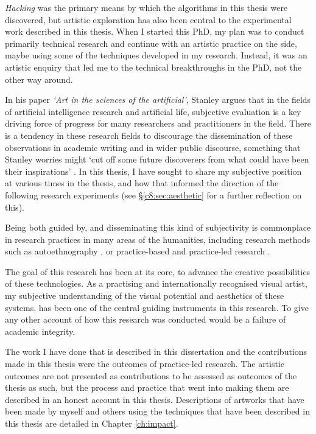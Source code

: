 \textit{Hacking} was the primary means by which the algorithms in this thesis were discovered, but artistic exploration has also been central to the experimental work described in this thesis. 
When I started this PhD, my plan was to conduct primarily technical research and continue with an artistic practice on the side, maybe using some of the techniques developed in my research. 
Instead, it was an artistic enquiry that led me to the technical breakthroughs in the PhD, not the other way around. 

In his paper \textit{`Art in the sciences of the artificial'}, Stanley argues that in the fields of artificial intelligence research and artificial life, subjective evaluation is a key driving force of progress for many researchers and practitioners in the field. 
There is a tendency in these research fields to discourage the dissemination of these observations in academic writing and in wider public discourse, something that Stanley worries might `cut off some future discoverers from what could have been their inspirations' \citep{stanley2018art}. 
In this thesis, I have sought to share my subjective position at various times in the thesis, and how that informed the direction of the following research experiments (see \S \ref{c8:sec:aesthetic} for a further reflection on this).

Being both guided by, and disseminating this kind of subjectivity is commonplace in research practices in many areas of the humanities, including research methods such as autoethnography \citep{reed1997auto}, or practice-based and practice-led research \citep{candy2006practice}. 

The goal of this research has been at its core, to advance the creative possibilities of these technologies. 
As a practising and internationally recognised visual artist, my subjective understanding of the visual potential and aesthetics of these systems, has been one of the central guiding instruments in this research. 
To give any other account of how this research was conducted would be a failure of academic integrity. 

The work  I have done that is described in this dissertation and the contributions made in this thesis were the outcomes of practice-led research. 
The artistic outcomes are not presented as contributions to be assessed as outcomes of the thesis as such, but the process and practice that went into making them are described in an honest account in this thesis. 
Descriptions of artworks that have been made by myself and others using the techniques that have been described in this thesis are detailed in Chapter \ref{ch:impact}.

